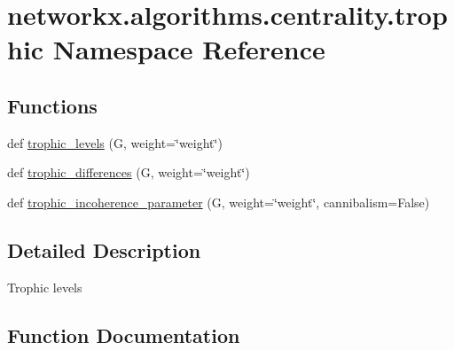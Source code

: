 \hypertarget{namespacenetworkx_1_1algorithms_1_1centrality_1_1trophic}{}\section{networkx.\+algorithms.\+centrality.\+trophic Namespace Reference}
\label{namespacenetworkx_1_1algorithms_1_1centrality_1_1trophic}
\subsection*{Functions}
\begin{DoxyCompactItemize}
\item 
def \hyperlink{namespacenetworkx_1_1algorithms_1_1centrality_1_1trophic_a6eb640118d1d1bc94a2ae651a175ad4e}{trophic\+\_\+levels} (G, weight=\char`\"{}weight\char`\"{})
\item 
def \hyperlink{namespacenetworkx_1_1algorithms_1_1centrality_1_1trophic_a3e19592cc036f1131aebdaa484b572fe}{trophic\+\_\+differences} (G, weight=\char`\"{}weight\char`\"{})
\item 
def \hyperlink{namespacenetworkx_1_1algorithms_1_1centrality_1_1trophic_a875b95b2b34a4b55cd69f423656bff23}{trophic\+\_\+incoherence\+\_\+parameter} (G, weight=\char`\"{}weight\char`\"{}, cannibalism=False)
\end{DoxyCompactItemize}


\subsection{Detailed Description}
\begin{DoxyVerb}Trophic levels\end{DoxyVerb}
 

\subsection{Function Documentation}
\mbox{\label{namespacenetworkx_1_1algorithms_1_1centrality_1_1trophic_a3e19592cc036f1131aebdaa484b572fe}} 
